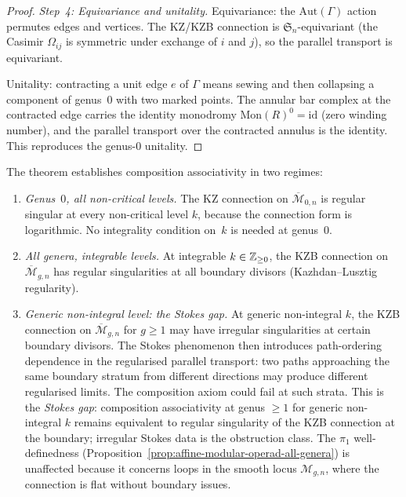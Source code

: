 \begin{proof}
\medskip\noindent
\emph{Step~4: Equivariance and unitality.}
Equivariance: the $\mathrm{Aut}(\Gamma)$ action permutes edges
and vertices. The KZ\slash KZB connection is
$\mathfrak{S}_n$-equivariant \textup{(}the Casimir
$\Omega_{ij}$ is symmetric under exchange of $i$ and $j$\textup{)},
so the parallel transport is equivariant.

Unitality: contracting a unit edge $e$ of $\Gamma$ means
sewing and then collapsing a component of genus~$0$ with two
marked points. The annular bar complex at the contracted edge
carries the identity monodromy
$\mathrm{Mon}(R)^0 = \mathrm{id}$ \textup{(}zero winding
number\textup{)}, and the parallel transport over the contracted
annulus is the identity. This reproduces the genus-$0$
unitality.
\end{proof}

\begin{remark}
\label{rem:composition-associativity-scope}
The theorem establishes composition associativity in two regimes:
\begin{enumerate}[label=\textup{(\roman*)}]
\item \emph{Genus~$0$, all non-critical levels.}
 The KZ connection on $\overline{\mathcal{M}}_{0,n}$ is
 regular singular at every non-critical level $k$, because
 the connection form is logarithmic. No integrality
 condition on~$k$ is needed at genus~$0$.

\item \emph{All genera, integrable levels.}
 At integrable $k \in \mathbb{Z}_{\ge 0}$, the KZB connection on
 $\overline{\mathcal{M}}_{g,n}$ has regular singularities
 at all boundary divisors
 \textup{(}Kazhdan--Lusztig regularity\textup{)}.

\item \emph{Generic non-integral level: the Stokes gap.}
 At generic non-integral $k$, the KZB connection on
 $\overline{\mathcal{M}}_{g,n}$ for $g \ge 1$ may have
 irregular singularities at certain boundary divisors.
 The Stokes phenomenon then introduces path-ordering
 dependence in the regularised parallel transport: two
 paths approaching the same boundary stratum from different
 directions may produce different regularised limits.
The composition axiom could fail at such strata.
This is the \emph{Stokes gap}: composition associativity
at genus $\ge 1$ for generic non-integral $k$ remains
equivalent to regular singularity of the KZB connection at the
boundary; irregular Stokes data is the obstruction class.
 The $\pi_1$ well-definedness
 \textup{(}Proposition~\textup{\ref{prop:affine-modular-operad-all-genera}}\textup{)}
 is unaffected because it concerns loops in the smooth
 locus $\mathcal{M}_{g,n}$, where the connection is flat
 without boundary issues.
\end{enumerate}
\end{remark}

